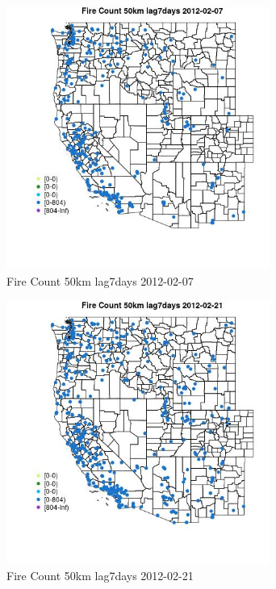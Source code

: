 \begin{figure} 
\centering  
\includegraphics[width=0.77\textwidth]{Code_Outputs/Report_ML_input_PM25_Step4_part_f_de_duplicated_aves_prioritize_24hr_obswNAs_MapObsFire_Count_50km_lag7days2012-02-07.jpg} 
\caption{\label{fig:Report_ML_input_PM25_Step4_part_f_de_duplicated_aves_prioritize_24hr_obswNAsMapObsFire_Count_50km_lag7days2012-02-07}Fire Count 50km lag7days 2012-02-07} 
\end{figure} 
 

\begin{figure} 
\centering  
\includegraphics[width=0.77\textwidth]{Code_Outputs/Report_ML_input_PM25_Step4_part_f_de_duplicated_aves_prioritize_24hr_obswNAs_MapObsFire_Count_50km_lag7days2012-02-21.jpg} 
\caption{\label{fig:Report_ML_input_PM25_Step4_part_f_de_duplicated_aves_prioritize_24hr_obswNAsMapObsFire_Count_50km_lag7days2012-02-21}Fire Count 50km lag7days 2012-02-21} 
\end{figure} 
 


